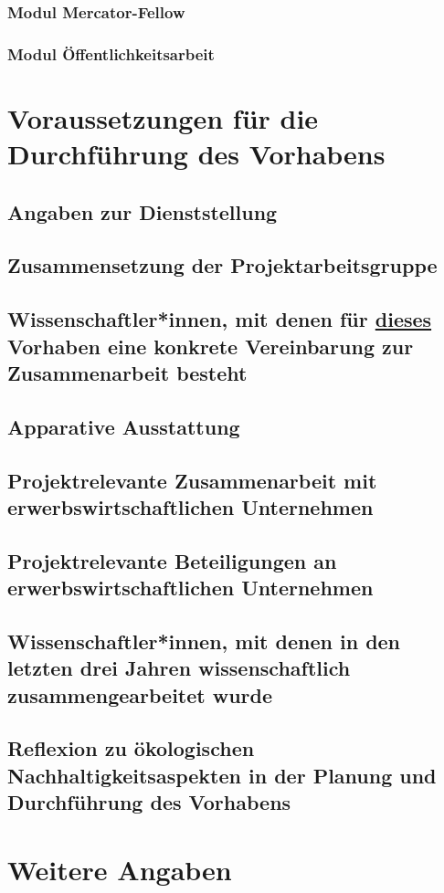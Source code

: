 \documentclass{scrartcl}
\begin{document}
\subsubsection{Modul Mercator-Fellow}

\subsubsection{Modul Öffentlichkeitsarbeit}


\section{Voraussetzungen für die Durchführung des Vorhabens}

\subsection{Angaben zur Dienststellung}

\subsection{Zusammensetzung der Projektarbeitsgruppe}

\subsection{Wissenschaftler*innen, mit denen für \underline{dieses} Vorhaben eine konkrete Vereinbarung zur Zusammenarbeit besteht}

\subsection{Apparative Ausstattung}

\subsection{Projektrelevante Zusammenarbeit mit erwerbswirtschaftlichen Unternehmen}

\subsection{Projektrelevante Beteiligungen an erwerbswirtschaftlichen Unternehmen}

\subsection{Wissenschaftler*innen, mit denen in den letzten drei Jahren wissenschaftlich zusammengearbeitet wurde}

\subsection{Reflexion zu ökologischen Nachhaltigkeitsaspekten in der Planung und Durchführung des Vorhabens}


\section{Weitere Angaben}
\end{document}
